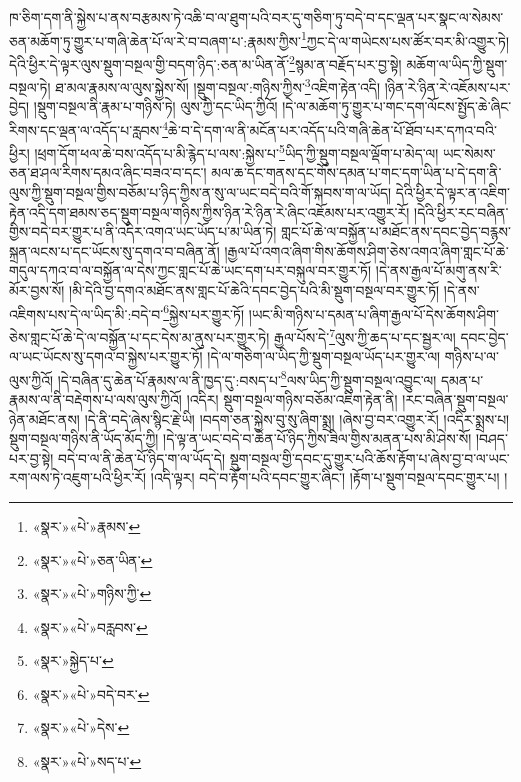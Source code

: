 ཁ་ཅིག་དག་ནི་སྐྱེས་པ་ནས་བརྩམས་ཏེ་འཆི་བ་ལ་ཐུག་པའི་བར་དུ་གཅིག་ཏུ་བདེ་བ་དང་ལྡན་པར་སྣང་ལ་སེམས་ཅན་མཆོག་ཏུ་གྱུར་པ་གཞི་ཆེན་པོ་ལ་རེ་བ་བཞག་པ་:རྣམས་ཀྱིས་\footnote{«སྣར་»«པེ་»རྣམས་}ཀྱང་དེ་ལ་གཡེངས་པས་ཚོར་བར་མི་འགྱུར་ཏེ། དེའི་ཕྱིར་དེ་ལྟར་ལུས་སྡུག་བསྔལ་གྱི་བདག་ཉིད་:ཅན་མ་ཡིན་ནོ་\footnote{«སྣར་»«པེ་»ཅན་ཡིན་}སྙམ་ན་བརྗོད་པར་བྱ་སྟེ། མཆོག་ལ་ཡིད་ཀྱི་སྡུག་བསྔལ་ཏེ། ཐ་མལ་རྣམས་ལ་ལུས་སྐྱེས་སོ། །སྡུག་བསྔལ་:གཉིས་ཀྱིས་\footnote{«སྣར་»«པེ་»གཉིས་ཀྱི་}འཇིག་རྟེན་འདི། །ཉིན་རེ་ཉིན་རེ་འཇོམས་པར་བྱེད། །སྡུག་བསྔལ་ནི་རྣམ་པ་གཉིས་ཏེ། ལུས་ཀྱི་དང་ཡིད་ཀྱིའོ། །དེ་ལ་མཆོག་ཏུ་གྱུར་པ་གང་དག་ལོངས་སྤྱོད་ཆེ་ཞིང་རིགས་དང་ལྡན་ལ་འདོད་པ་རླབས་\footnote{«སྣར་»«པེ་»བརླབས་}ཆེ་བ་དེ་དག་ལ་ནི་མངོན་པར་འདོད་པའི་གཞི་ཆེན་པོ་ཐོབ་པར་དཀའ་བའི་ཕྱིར། །ཕྲག་དོག་ཕལ་ཆེ་བས་འདོད་པ་མི་རྙེད་པ་ལས་:སྐྱེས་པ་\footnote{«སྣར་»སྐྱེད་པ་}ཡིད་ཀྱི་སྡུག་བསྔལ་ལྡོག་པ་མེད་ལ། ཡང་སེམས་ཅན་ཐ་ཤལ་རིགས་དམའ་ཞིང་བཟའ་བ་དང་། མལ་ཆ་དང་གནས་དང་གོས་དམན་པ་གང་དག་ཡིན་པ་དེ་དག་ནི་ལུས་ཀྱི་སྡུག་བསྔལ་གྱིས་བཅོམ་པ་ཉིད་ཀྱིས་ན་སུ་ལ་ཡང་བདེ་བའི་གོ་སྐབས་ག་ལ་ཡོད། དེའི་ཕྱིར་དེ་ལྟར་ན་འཇིག་རྟེན་འདི་དག་ཐམས་ཅད་སྡུག་བསྔལ་གཉིས་ཀྱིས་ཉིན་རེ་ཉིན་རེ་ཞིང་འཇོམས་པར་འགྱུར་རོ། །དེའི་ཕྱིར་རང་བཞིན་གྱིས་བདེ་བར་གྱུར་པ་ནི་འདིར་འགའ་ཡང་ཡོད་པ་མ་ཡིན་ཏེ། གླང་པོ་ཆེ་ལ་བསྐྱོན་པ་མཐོང་ནས་དབང་བྱེད་བརྙས་སྐྲན་ལངས་པ་དང་ཡོངས་སུ་དགའ་བ་བཞིན་ནོ། །རྒྱལ་པོ་འགའ་ཞིག་གིས་ཆོགས་ཤིག་ཅེས་འགའ་ཞིག་གླང་པོ་ཆེ་གདུལ་དཀའ་བ་ལ་བསྐྱོན་ལ་དེས་ཀྱང་གླང་པོ་ཆེ་ཡང་དག་པར་བསྐུལ་བར་གྱུར་ཏོ། །དེ་ནས་རྒྱལ་པོ་མགུ་ནས་རི་མོར་བྱས་སོ། །མི་དེའི་བྱ་དགའ་མཐོང་ནས་གླང་པོ་ཆེའི་དབང་བྱེད་པའི་མི་སྡུག་བསྔལ་བར་གྱུར་ཏོ། །དེ་ནས་འཇིགས་པས་དེ་ལ་ཡིད་མི་:བདེ་བ་\footnote{«སྣར་»«པེ་»བདེ་བར་}སྐྱེས་པར་གྱུར་ཏོ། །ཡང་མི་གཉིས་པ་དམན་པ་ཞིག་རྒྱལ་པོ་དེས་ཆོགས་ཤིག་ཅེས་གླང་པོ་ཆེ་དེ་ལ་བསྐྱོན་པ་དང་དེས་མ་ནུས་པར་གྱུར་ཏེ། རྒྱལ་པོས་དེ་\footnote{«སྣར་»«པེ་»དེས་}ལུས་ཀྱི་ཆད་པ་དང་སྦྱར་ལ། དབང་བྱེད་ལ་ཡང་ཡོངས་སུ་དགའ་བ་སྐྱེས་པར་གྱུར་ཏོ། །དེ་ལ་གཅིག་ལ་ཡིད་ཀྱི་སྡུག་བསྔལ་ཡོད་པར་གྱུར་ལ། གཉིས་པ་ལ་ལུས་ཀྱིའོ། །དེ་བཞིན་དུ་ཆེན་པོ་རྣམས་ལ་ནི་ཁྱད་དུ་:བསད་པ་\footnote{«སྣར་»«པེ་»སད་པ་}ལས་ཡིད་ཀྱི་སྡུག་བསྔལ་འབྱུང་ལ། དམན་པ་རྣམས་ལ་ནི་བརྡེགས་པ་ལས་ལུས་ཀྱིའོ། །འདིར། སྡུག་བསྔལ་གཉིས་བཅོམ་འཇིག་རྟེན་ནི། །རང་བཞིན་སྡུག་བསྔལ་ཉེན་མཐོང་ནས། །དེ་ནི་བདེ་ཞེས་སྙིང་རྗེ་ཡི། །བདག་ཅན་སྐྱེས་བུ་སུ་ཞིག་སྨྲ། །ཞེས་བྱ་བར་འགྱུར་རོ། །འདིར་སྨྲས་པ། སྡུག་བསྔལ་གཉིས་ནི་ཡོད་མོད་ཀྱི། །དེ་ལྟ་ན་ཡང་བདེ་བ་ཆེན་པོ་ཉིད་ཀྱིས་ཟིལ་གྱིས་མནན་པས་མི་ཤེས་སོ། །བཤད་པར་བྱ་སྟེ། བདེ་བ་ལ་ནི་ཆེན་པོ་ཉིད་ག་ལ་ཡོད་དེ། སྡུག་བསྔལ་གྱི་དབང་དུ་གྱུར་པའི་ཆོས་རྟོག་པ་ཞེས་བྱ་བ་ལ་ཡང་རག་ལས་ཏེ་འཇུག་པའི་ཕྱིར་རོ། །འདི་ལྟར། བདེ་བ་རྟོག་པའི་དབང་གྱུར་ཞིང་། །རྟོག་པ་སྡུག་བསྔལ་དབང་གྱུར་པ། །

